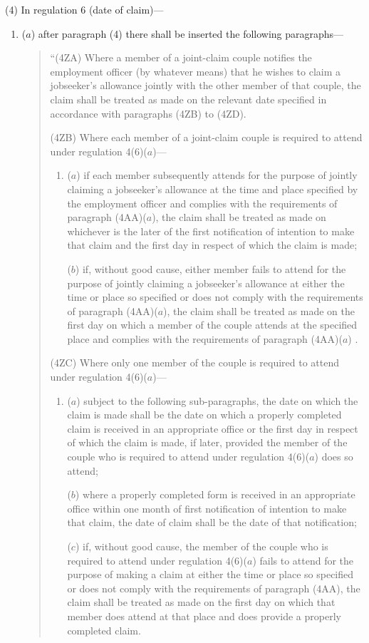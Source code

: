 \documentclass[12pt,a4paper]{article}
\begin{document}
(4) In regulation 6 (date of claim)—
\begin{enumerate}\item[]
($a$) after paragraph (4) there shall be inserted the following paragraphs—
\begin{quotation}
“(4ZA) Where a member of a joint-claim couple notifies the employment officer (by whatever means) that he wishes to claim a jobseeker’s allowance jointly with the other member of that couple, the claim shall be treated as made on the relevant date specified in accordance with paragraphs (4ZB) to (4ZD).

(4ZB) Where each member of a joint-claim couple is required to attend under regulation 4(6)($a$)—
\begin{enumerate}\item[]
($a$) if each member subsequently attends for the purpose of jointly claiming a jobseeker’s allowance at the time and place specified by the employment officer and complies with the requirements of paragraph (4AA)($a$), the claim shall be treated as made on whichever is the later of the first notification of intention to make that claim and the first day in respect of which the claim is made;

($b$) if, without good cause, either member fails to attend for the purpose of jointly claiming a jobseeker’s allowance at either the time or place so specified or does not comply with the requirements of paragraph (4AA)($a$), the claim shall be treated as made on the first day on which a member of the couple attends at the specified place and complies with the requirements of paragraph (4AA)($a$) .
\end{enumerate}

(4ZC) Where only one member of the couple is required to attend under regulation 4(6)($a$)—
\begin{enumerate}\item[]
($a$) subject to the following sub-paragraphs, the date on which the claim is made shall be the date on which a properly completed claim is received in an appropriate office or the first day in respect of which the claim is made, if later, provided the member of the couple who is required to attend under regulation 4(6)($a$)  does so attend;

($b$) where a properly completed form is received in an appropriate office within one month of first notification of intention to make that claim, the date of claim shall be the date of that notification;

($c$) if, without good cause, the member of the couple who is required to attend under regulation 4(6)($a$)  fails to attend for the purpose of making a claim at either the time or place so specified or does not comply with the requirements of paragraph (4AA), the claim shall be treated as made on the first day on which that member does attend at that place and does provide a properly completed claim.
\end{enumerate}


\end{quotation}
\end{enumerate}
\end{document}
